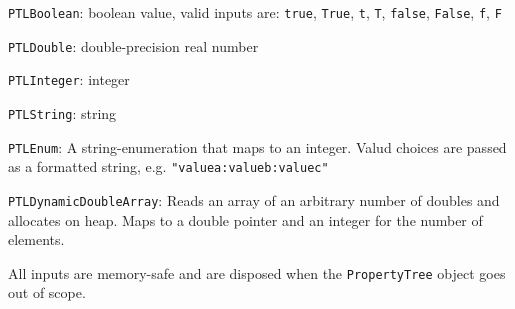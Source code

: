 \documentclass[10pt]{article}
\begin{document}
\ilist
{
	\item \texttt{PTLBoolean}: boolean value, valid inputs are: \texttt{true}, \texttt{True}, \texttt{t}, \texttt{T}, \texttt{false}, \texttt{False}, \texttt{f}, \texttt{F}
	\item \texttt{PTLDouble}: double-precision real number
	\item \texttt{PTLInteger}: integer
	\item \texttt{PTLString}: string
	\item \texttt{PTLEnum}: A string-enumeration that maps to an integer. Valud choices are passed as a formatted string, e.g. \texttt{"valuea:valueb:valuec"}
	\item \texttt{PTLDynamicDoubleArray}: Reads an array of an arbitrary number of doubles and allocates on heap. Maps to a double pointer and an integer for the number of elements.
}

All inputs are memory-safe and are disposed when the \texttt{PropertyTree} object goes out of scope.
\end{document}

